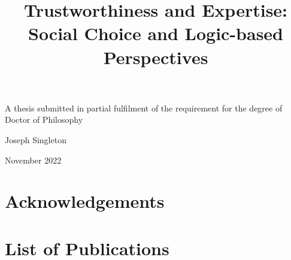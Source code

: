\documentclass[a4paper,12pt,oneside]{memoir}
\title{
    Trustworthiness and Expertise: Social Choice and Logic-based Perspectives
}
\begin{document}
\begin{titlingpage}

    \begin{center}
        {\HUGE\bfseries \thetitle}
        \par
        \vspace{2cm}
        {\Large A thesis submitted in partial fulfilment of the requirement for
        the degree of Doctor of Philosophy}
        \par
        \vspace{2cm}
        {\LARGE Joseph Singleton}
        \par
        \vspace{10cm}
        {\Large November 2022}
    \end{center}

    \clearpage

\end{titlingpage}

\frontmatter

\begin{abstract}
    \thispagestyle{plain}
    
\end{abstract}

\newpage

\tableofcontents

\clearpage

\chapter*{Acknowledgements}


\chapter*{List of Publications}


\mainmatter

\printbibliography
\appendix

\end{document}
